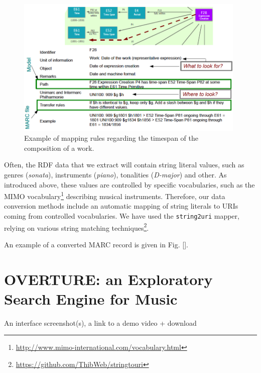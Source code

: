 \documentclass[runningheads,a4paper]{llncs}
\begin{document}
\begin{figure}
  \centering
  \includegraphics[width=11cm]{img/mapping-rules.png}
  \caption{Example of mapping rules regarding the timespan of the composition of a work.}
  \label{fig:mappings}
\end{figure}

Often, the RDF data that we extract will contain string literal values, such as genres ({\it sonata}), instruments ({\it piano}), tonalities ({\it D-major}) and other. As introduced above, these values are controlled by specific vocabularies, such as the MIMO vocabulary\footnote{\url{http://www.mimo-international.com/vocabulary.html}} describing musical instruments. Therefore, our data conversion methods include an automatic mapping of string literals to URIs coming from controlled vocabularies. We have used the {\tt string2uri} mapper, relying on various string matching techniques\footnote{\url{https://github.com/ThibWeb/stringtouri}}.

An example of a converted MARC record is given in Fig. \ref{}. %


\section{OVERTURE: an Exploratory Search Engine for Music}
\label{sec:overture}
An interface screenshot(s), a link to a demo video + download

\end{document}
